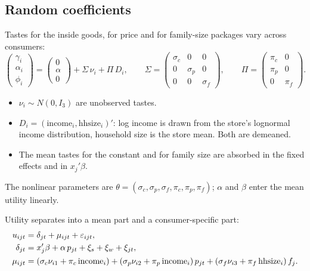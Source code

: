 \documentclass[11pt]{article}
\begin{document}
\subsection{Random coefficients}

Tastes for the inside goods, for price and for family-size packages vary across consumers:
\begin{equation}
  \begin{pmatrix} \gamma_i \\ \alpha_i \\ \phi_i \end{pmatrix}
  =
  \begin{pmatrix} 0 \\ \alpha \\ 0 \end{pmatrix}
  + \Sigma\, \nu_i + \Pi\, D_i ,
  \qquad
  \Sigma = \begin{pmatrix} \sigma_c & 0 & 0 \\ 0 & \sigma_p & 0 \\ 0 & 0 & \sigma_f \end{pmatrix},
  \qquad
  \Pi = \begin{pmatrix} \pi_c & 0 \\ \pi_p & 0 \\ 0 & \pi_f \end{pmatrix}.
  \label{eq:rc}
\end{equation}
\begin{itemize}
  \item $\nu_i \sim N(0, I_3)$ are unobserved tastes.
  \item $D_i = (\text{income}_i, \text{hhsize}_i)'$: log income is drawn from the store's
        lognormal income distribution, household size is the store mean. Both are demeaned.
  \item The mean tastes for the constant and for family size are absorbed in the fixed
        effects and in $x_j'\beta$.
\end{itemize}
The nonlinear parameters are
$\theta = (\sigma_c, \sigma_p, \sigma_f, \pi_c, \pi_p, \pi_f)$; $\alpha$ and $\beta$ enter the
mean utility linearly.

Utility separates into a mean part and a consumer-specific part:
\begin{align}
  u_{ijt} &= \delta_{jt} + \mu_{ijt} + \varepsilon_{ijt}, \notag \\
  \delta_{jt} &= x_j'\beta + \alpha\, p_{jt} + \xi_s + \xi_w + \xi_{jt}, \label{eq:delta} \\
  \mu_{ijt} &= (\sigma_c \nu_{i1} + \pi_c\, \text{income}_i)
             + (\sigma_p \nu_{i2} + \pi_p\, \text{income}_i)\, p_{jt}
             + (\sigma_f \nu_{i3} + \pi_f\, \text{hhsize}_i)\, f_j . \label{eq:mu}
\end{align}
\end{document}
